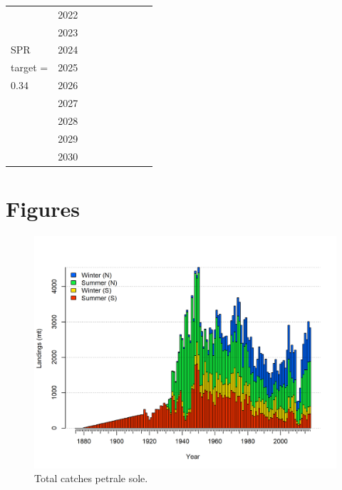 \documentclass[12pt,]{article}
\begin{document}
\begin{table}[ht]
{\begin{tabular}{l|cc|>{\centering}p{.7in}c|>{\centering}p{.7in}c|>{\centering}p{.7in}c}
   & 2022 &  &  &  &  &  &  &  \\ 
   & 2023 &  &  &  &  &  &  &  \\ 
  SPR  & 2024 &  &  &  &  &  &  &  \\ 
  target =  & 2025 &  &  &  &  &  &  &  \\ 
  0.34 & 2026 &  &  &  &  &  &  &  \\ 
   & 2027 &  &  &  &  &  &  &  \\ 
   & 2028 &  &  &  &  &  &  &  \\ 
   & 2029 &  &  &  &  &  &  &  \\ 
   & 2030 &  &  &  &  &  &  &  \\ 
   \hline
\end{tabular}
}
\end{table}

\clearpage

\section{Figures}\label{figures}

\FloatBarrier

\begin{figure}
\centering
\includegraphics{r4ss/plots_mod1/catch2 landings stacked.png}
\caption{Total catches petrale sole. \label{fig:Catch}}
\end{figure}

\FloatBarrier
\end{document}
